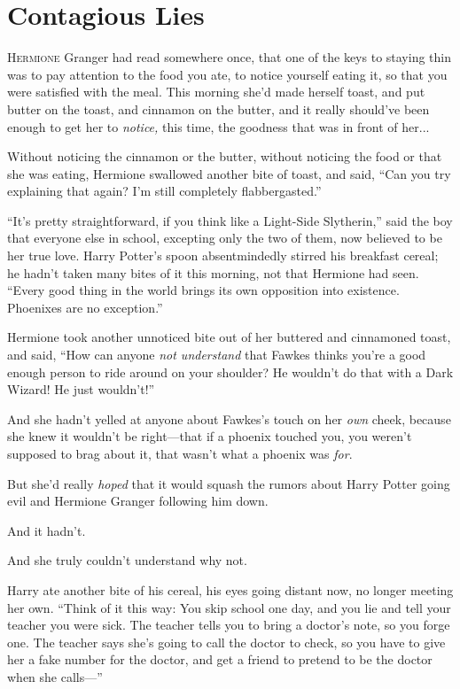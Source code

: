 \chapter{Contagious Lies}

\lettrine{H}{ermione} Granger had read somewhere once, that one of the keys to staying thin was to pay attention to the food you ate, to notice yourself eating it, so that you were satisfied with the meal. This morning she’d made herself toast, and put butter on the toast, and cinnamon on the butter, and it really should’ve been enough to get her to \emph{notice,} this time, the goodness that was in front of her...

Without noticing the cinnamon or the butter, without noticing the food or that she was eating, Hermione swallowed another bite of toast, and said, “Can you try explaining that again? I’m still completely flabbergasted.”

“It’s pretty straightforward, if you think like a Light-Side Slytherin,” said the boy that everyone else in school, excepting only the two of them, now believed to be her true love. Harry Potter’s spoon absentmindedly stirred his breakfast cereal; he hadn’t taken many bites of it this morning, not that Hermione had seen. “Every good thing in the world brings its own opposition into existence. Phoenixes are no exception.”

Hermione took another unnoticed bite out of her buttered and cinnamoned toast, and said, “How can anyone \emph{not understand} that Fawkes thinks you’re a good enough person to ride around on your shoulder? He wouldn’t do that with a Dark Wizard! He just wouldn’t!”

And she hadn’t yelled at anyone about Fawkes’s touch on her \emph{own} cheek, because she knew it wouldn’t be right—that if a phoenix touched you, you weren’t supposed to brag about it, that wasn’t what a phoenix was \emph{for}.

But she’d really \emph{hoped} that it would squash the rumors about Harry Potter going evil and Hermione Granger following him down.

And it hadn’t.

And she truly couldn’t understand why not.

Harry ate another bite of his cereal, his eyes going distant now, no longer meeting her own. “Think of it this way: You skip school one day, and you lie and tell your teacher you were sick. The teacher tells you to bring a doctor’s note, so you forge one. The teacher says she’s going to call the doctor to check, so you have to give her a fake number for the doctor, and get a friend to pretend to be the doctor when she calls—”

